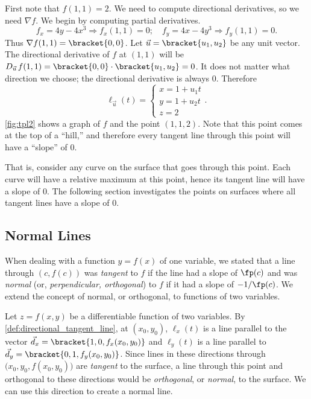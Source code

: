 {First note that $f(1,1) = 2$. We need to compute directional derivatives, so we need $\nabla f$. We begin by computing partial derivatives.
\[
f_x = 4y-4x^3 \Rightarrow f_x(1,1) = 0;\quad f_y = 4x-4y^3\Rightarrow f_y(1,1) = 0.
\]
Thus $\nabla f(1,1) =\bracket{0,0}$. Let $\vec u =\bracket{u_1,u_2}$ be any unit vector. The directional derivative of $f$ at $(1,1)$ will be $D_{\vec u\,}f(1,1) =\bracket{0,0}\cdot\bracket{u_1,u_2}= 0$. It does not matter what direction we choose; the directional derivative is always 0. Therefore
%
%
\[
\ell_{\vec u}(t) = \begin{cases}x= 1 +u_1t\\ y = 1+ u_2 t\\ z= 2\end{cases}.
\]
\autoref{fig:tpl2} shows a graph of $f$ and the point $(1,1,2)$. Note that this point comes at the top of a ``hill,'' and therefore every tangent line through this point will have a ``slope'' of 0. 

That is, consider any curve on the surface that goes through this point. Each curve will have a relative maximum at this point, hence its tangent line will have a slope of 0. The following section investigates the points on surfaces where all tangent lines have a slope of 0.}

\subsection*{Normal Lines}

When dealing with a function $y=f(x)$ of one variable, we stated that a line through $(c,f(c))$ was \textit{tangent} to $f$ if the line had a slope of $\fp(c)$ and was \textit{normal} (or, \textit{perpendicular, orthogonal}) to $f$ if it had a slope of $-1/\fp(c)$. We extend the concept of normal, or orthogonal, to functions of two variables. 

Let $z=f(x,y)$ be a differentiable function of two variables. By \autoref{def:directional_tangent_line}, at $(x_0,y_0)$, $\ell_x(t)$ is a line parallel to the vector $\vec d_x=\bracket{1,0,f_x(x_0,y_0)}$ and $\ell_y(t)$ is a line parallel to $\vec d_y=\bracket{0,1,f_y(x_0,y_0)}$. Since lines in these directions through $\big(x_0,y_0,f(x_0,y_0)\big)$ are \textit{tangent} to the surface, a line through this point and orthogonal to these directions would be \textit{orthogonal}, or \textit{normal}, to the surface. We can use this direction to create a normal line.


